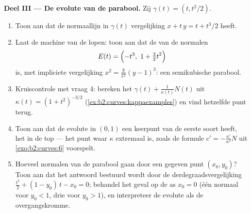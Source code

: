 \begin{problem}
\medskip
\noindent\textbf{Deel III --- De evolute van de parabool.} Zij
$\gamma(t) = (t, t^2/2)$.
\begin{enumerate}[resume]
  \item Toon aan dat de normaallijn in $\gamma(t)$ vergelijking $x
        + t\,y = t + t^3/2$ heeft.
  \item Laat de machine van de  lopen: toon aan dat de
         van de normalen
        \[
        E(t) = \Bigl(-t^3,\ 1 + \tfrac32 t^2\Bigr)
        \]
        is, met impliciete vergelijking $x^2 = \tfrac8{27}(y -
        1)^3$: een semikubische parabool.
  \item Kruiscontrole met vraag 4: bereken het
         $\gamma(t) + \frac1{\kappa(t)}N(t)$
        uit $\kappa(t) = (1 + t^2)^{-3/2}$
        (\cref{ex:b2:curves:kappaexamples}) en vind hetzelfde punt
        terug.
  \item Toon aan dat de evolute in $(0, 1)$ een keerpunt van de
        eerste soort heeft, het  in de top ---
        het punt waar $\kappa$ extremaal is, zoals de formule $c' =
        -\frac{\kappa'}{\kappa^2}N$ uit \cref{exo:b2:curves:6}
        voorspelt.
  \item Hoeveel normalen van de parabool gaan door een gegeven
        punt $(x_0, y_0)$? Toon aan dat het antwoord bestuurd wordt
        door de derdegraadsvergelijking $\tfrac{t^3}2 + (1 -
        y_0)\,t - x_0 = 0$; behandel het geval op de as $x_0 = 0$
         (één normaal voor $y_0 < 1$, drie voor $y_0 > 1$),
        en interpreteer de evolute als de overgangskromme.
\end{enumerate}


\end{problem}

